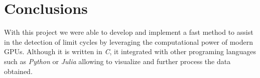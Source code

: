 
\section{Conclusions}%
\label{sec:conclusions}

With this project we were able to develop and implement a fast method to assist in the detection of limit cycles by leveraging the computational power of modern GPUs. Although it is written in \emph{C}, it integrated with other programing languages such as \emph{Python} or \emph{Julia} allowing to visualize and further process the data
obtained.
